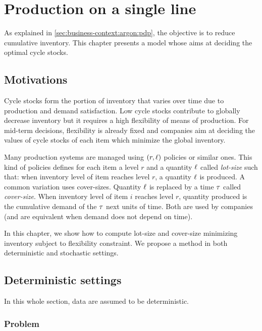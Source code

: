 \chapter{Production on a single line}
\label{chap:lot-size:single-line}


As explained in \cref{sec:business-context:argon:pdp}, the objective is to reduce cumulative inventory.
This chapter presents a model whose aims at deciding the optimal cycle stocks.



\section{Motivations}
\label{sec:lot-size:single-line:motivations}

Cycle stocks form the portion of inventory that varies over time due to production and demand satisfaction.
Low cycle stocks contribute to globally decrease inventory but it requires a high flexibility of means of production.
For mid-term decisions, flexibility is already fixed and companies aim at deciding the values of cycle stocks of each item which minimize the global inventory.


Many production systems are managed using $(r,\ell)$ policies or similar ones.
This kind of policies defines for each item a level $r$ and a quantity $\ell$ called \emph{lot-size} such that: when inventory level of item reaches level $r$, a quantity $\ell$ is produced.
A common variation uses cover-sizes.
Quantity $\ell$ is replaced by a time $\tau$ called \emph{cover-size}.
When inventory level of item $i$ reaches level $r$, quantity produced is the cumulative demand of the $\tau$ next units of time.
Both are used by companies (and are equivalent when demand does not depend on time).


In this chapter, we show how to compute lot-size and cover-size minimizing inventory subject to flexibility constraint.
We propose a method in both deterministic and stochastic settings.


\section{Deterministic settings}
\label{sec:lot-size:single-line:deterministic}

In this whole section, data are assumed to be deterministic.


\subsection{Problem}
\label{sec:lot-size:single-line:deterministic:problems}

